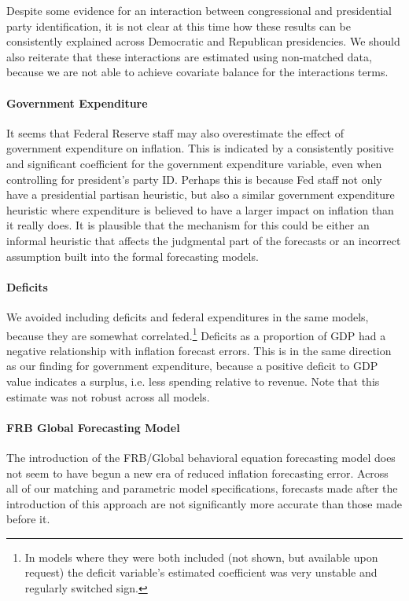 \documentclass[a4paper]{article}\usepackage{graphicx, color}
\begin{document}
Despite some evidence for an interaction between congressional and presidential party identification, it is not clear at this time how these results can be consistently explained across Democratic and Republican presidencies. We should also reiterate that these interactions are estimated using non-matched data, because we are not able to achieve covariate balance for the interactions terms.


\paragraph{Government Expenditure}

It seems that Federal Reserve staff may also overestimate the effect of government expenditure on inflation. This is indicated by a consistently positive and significant coefficient for the government expenditure variable, even when controlling for president's party ID. Perhaps this is because Fed staff not only have a presidential partisan heuristic, but also a similar government expenditure heuristic where expenditure is believed to have a larger impact on inflation than it really does. It is plausible that the mechanism for this could be either an informal heuristic that affects the judgmental part of the forecasts or an incorrect assumption built into the formal forecasting models.

\paragraph{Deficits} We avoided including deficits and federal expenditures in the same models, because they are somewhat correlated.\footnote{In models where they were both included (not shown, but available upon request) the deficit variable's estimated coefficient was very unstable and regularly switched sign.} Deficits as a proportion of GDP had a negative relationship with inflation forecast errors. This is in the same direction as our finding for government expenditure, because a positive deficit to GDP value indicates a surplus, i.e. less spending relative to revenue. Note that this estimate was not robust across all models.

\paragraph{FRB Global Forecasting Model}

The introduction of the FRB/Global behavioral equation forecasting model does not seem to have begun a new era of reduced inflation forecasting error. Across all of our matching and parametric model specifications, forecasts made after the introduction of this approach are not significantly more accurate than those made before it. 
\end{document}
